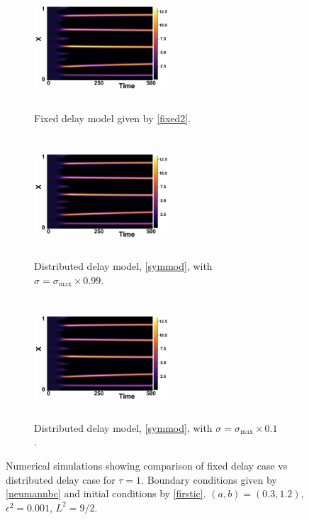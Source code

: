 \begin{figure}[H]
   \centering
   \begin{subfigure}[t]{0.32\textwidth}
       \centering
       \includegraphics[width=5cm,height=4.5cm]{dist2t1sigmax.png}
       \caption{Fixed delay model given by \eqref{fixed2}.}
       \label{}
   \end{subfigure}
   \hfill
   \begin{subfigure}[t]{0.32\textwidth}
       \centering
       \includegraphics[width=5cm,height=4.5cm]{dist2t1sigmax.png}
       \caption{Distributed delay model, \eqref{symmod}, with $\sigma=\sigma_{\max}\times0.99$.}
       \label{}
   \end{subfigure}
   \hfill
   \begin{subfigure}[t]{0.32\textwidth}
       \centering
       \includegraphics[width=5cm,height=4.5cm]{dist2t1sigmax.png}
       \caption{Distributed delay model, \eqref{symmod}, with $\sigma=\sigma_{\max}\times0.1$.}
       \label{}
   \end{subfigure}
   \caption{Numerical simulations showing comparison of fixed delay case vs distributed delay case for $\tau=1$. Boundary conditions given by \eqref{neumannbc} and initial conditions by \eqref{firstic}. $(a,b)=(0.3,1.2)$, $\epsilon^2=0.001$, $L^2=9/2$.}
   \label{fig:distres3}
\end{figure}
